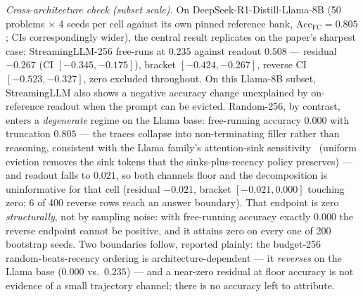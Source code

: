 \documentclass{article}
\newcommand{\accfc}{\mathrm{Acc}_{\mathrm{FC}}}
\begin{document}
\emph{Cross-architecture check (subset scale).} On DeepSeek-R1-Distill-Llama-8B (50 problems $\times$ 4 seeds per cell against its own pinned reference bank, $\accfc = 0.805$; CIs correspondingly wider), the central result replicates on the paper's sharpest case: StreamingLLM-256 free-runs at $0.235$ against readout $0.508$ --- residual $-0.267$ (CI $[-0.345, -0.175]$), bracket $[-0.424, -0.267]$, reverse CI $[-0.523, -0.327]$, zero excluded throughout. On this Llama-8B subset, StreamingLLM also shows a negative accuracy change unexplained by on-reference readout when the prompt can be evicted. Random-256, by contrast, enters a \emph{degenerate} regime on the Llama base: free-running accuracy $0.000$ with truncation $0.805$ --- the traces collapse into non-terminating filler rather than reasoning, consistent with the Llama family's attention-sink sensitivity~\citep{xiao2023streamingllm} (uniform eviction removes the sink tokens that the sinks-plus-recency policy preserves) --- and readout falls to $0.021$, so both channels floor and the decomposition is uninformative for that cell (residual $-0.021$, bracket $[-0.021, 0.000]$ touching zero; 6 of 400 reverse rows reach an answer boundary). That endpoint is zero \emph{structurally}, not by sampling noise: with free-running accuracy exactly $0.000$ the reverse endpoint cannot be positive, and it attains zero on every one of 200 bootstrap seeds. Two boundaries follow, reported plainly: the budget-256 random-beats-recency ordering is architecture-dependent --- it \emph{reverses} on the Llama base ($0.000$ vs.\ $0.235$) --- and a near-zero residual at floor accuracy is not evidence of a small trajectory channel; there is no accuracy left to attribute.
\end{document}
